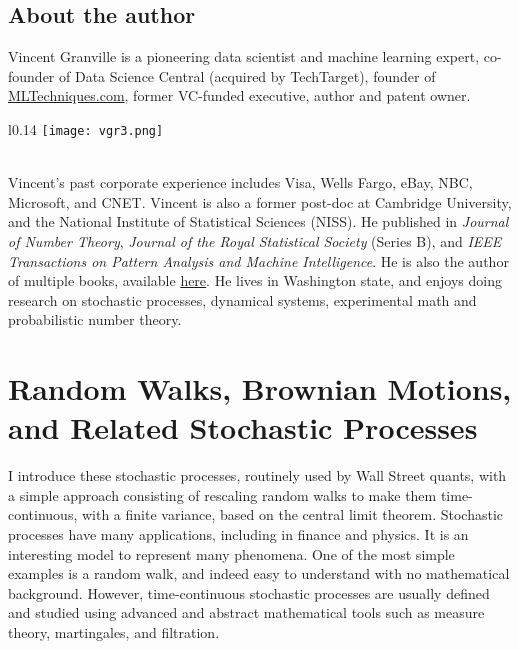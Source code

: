 \documentclass[oneside,10pt]{book}
\begin{document}
\section*{About the author}

Vincent Granville is a pioneering data scientist and machine learning expert, co-founder of Data Science Central  (acquired by TechTarget), founder of \href{https://mltechniques.com/}{MLTechniques.com}, former VC-funded executive, author and patent owner.
\begin{wrapfigure}{l}{0.14\textwidth}
\vspace{-1ex}
\texttt{[image: vgr3.png]} 
\end{wrapfigure}
\vspace{-2ex}\quad \\
\noindent Vincent’s past corporate experience includes Visa, Wells Fargo, eBay, NBC, Microsoft, and CNET. 
Vincent is also a former post-doc at Cambridge University, and the National Institute of Statistical Sciences (NISS).  
He  published in {\em Journal of Number Theory}, {\em Journal of the Royal Statistical Society} (Series B), and {\em IEEE Transactions on Pattern Analysis and Machine Intelligence}. He is also the author of multiple books, available \href{https://mltechniques.com/resources/}{here}. He lives  in Washington state, and enjoys doing research on stochastic processes, dynamical systems, experimental math and probabilistic number theory.

\listoffigures


\hypersetup{linkcolor=red}
\renewcommand{\baselinestretch}{1.00}\normalsize
\tableofcontents 
\renewcommand{\baselinestretch}{1.00}\normalsize

\chapter{Random Walks, Brownian Motions, and Related Stochastic Processes}\label{ch1}

I introduce these stochastic processes, routinely used by Wall Street quants, with a simple approach consisting of rescaling random walks to make them time-continuous, with a finite variance, based on the central limit theorem. 
Stochastic processes have many applications, including in finance and physics. It is an interesting model to represent many phenomena. 
One of the most simple examples is a random walk, and indeed easy to understand with no mathematical background. However, time-continuous stochastic processes are usually defined and studied using advanced and abstract mathematical tools such as measure theory, martingales, and filtration. 
\end{document}
